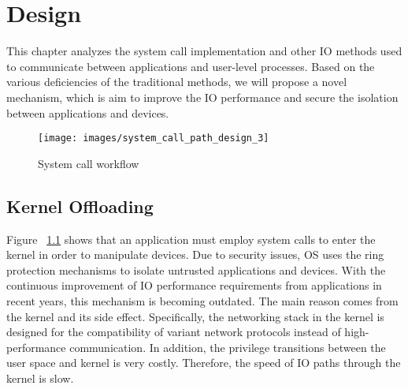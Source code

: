 \chapter{Design}
\label{sec:design}





This chapter analyzes the system call implementation and other 
IO methods used to communicate between applications 
and user-level processes. Based on the various deficiencies of the 
traditional methods, we will propose a novel mechanism, which is aim 
to improve the IO performance and secure the isolation 
between applications and devices.


\begin{figure}[H]
  \centering
  \texttt{[image: images/system\_call\_path\_design\_3]}
  \caption[Short description]{System call workflow}
  \label{fig:system_call_path_design_3}
\end{figure}

\section{Kernel Offloading}
Figure ~\ref{fig:system_call_path_design_3} shows that an application must employ system calls to enter the kernel in order to manipulate devices.
Due to security issues, OS uses the ring protection mechanisms\cite{13} to isolate untrusted
applications and devices. 
With the continuous improvement of IO performance requirements 
from applications in recent years, this mechanism is becoming outdated. 
The main reason comes from the kernel and its side effect. Specifically, 
the networking stack in the kernel is designed for the compatibility of 
variant network protocols instead of high-performance communication. 
In addition, the privilege transitions between the user space and kernel 
is very costly. Therefore, the speed of IO paths through the kernel is slow.

